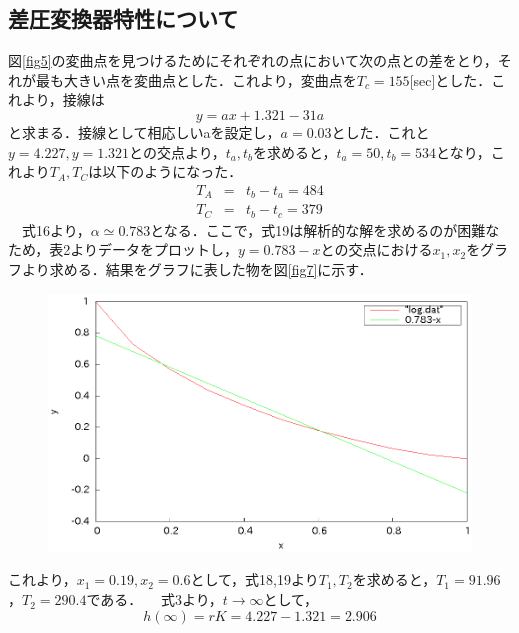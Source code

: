\documentclass[11pt,a4paper]{jsarticle}
\begin{document}
\subsection{差圧変換器特性について}
図\ref{fig5}の変曲点を見つけるためにそれぞれの点において次の点との差をとり，それが最も大きい点を変曲点とした．これより，変曲点を$T_c = 155$[sec]とした．これより，接線は
\begin{equation}
 y = ax + 1.321 - 31a
\end{equation}
と求まる．接線として相応しいaを設定し，$a = 0.03$とした．これと$y = 4.227,y = 1.321$との交点より，$t_a, t_b$を求めると，$t_a = 50, t_b = 534$となり，これより$T_A, T_C$は以下のようになった．
\begin{eqnarray}
 T_A & = & t_b - t_a = 484 \\
 T_C & = & t_b - t_c = 379
\end{eqnarray}
　式16より，$\alpha \simeq 0.783$となる．ここで，式19は解析的な解を求めるのが困難なため，表2よりデータをプロットし，$y = 0.783 - x$との交点における$x_1,x_2$をグラフより求める．結果をグラフに表した物を図\ref{fig7}に示す．

\begin{figure}[h]
 \begin{center}
  \includegraphics[scale = 1]{./picture/log.eps}
 \end{center}
\end{figure}

これより，$x_1 = 0.19,x_2 = 0.6$として，式18,19より$T_1,T_2$を求めると，$T_1 = 91.96$，$T_2 = 290.4$である．
　式3より，$t \to \infty$として，
\begin{equation}
 h(\infty) = rK = 4.227 - 1.321 = 2.906
\end{equation}


\newpage
\pagestyle{fancy}
\renewcommand{\headrulewidth}{0.0pt}
\cfoot{}
\setcounter{section}{4}
\end{document}
